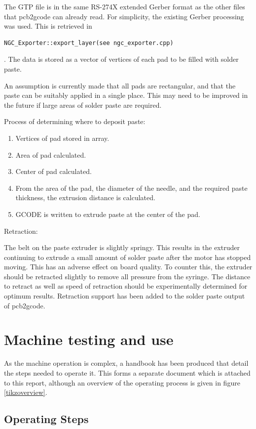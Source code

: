 The GTP file is in the same RS-274X extended Gerber format as the other files that pcb2gcode can already read. For simplicity, the existing Gerber processing was used.
This is retrieved in \begin{verbatim}NGC_Exporter::export_layer(see ngc_exporter.cpp)\end{verbatim}. The data is stored as a vector of vertices of each pad to be filled with solder paste.

An assumption is currently made that all pads are rectangular, and that the paste can be suitably applied in a single place. This may need to be improved in the future if large areas
of solder paste are required.

Process of determining where to deposit paste:

\begin{enumerate}
	\item	Vertices of pad stored in array.
	\item	Area of pad calculated.
	\item	Center of pad calculated.
	\item	From the area of the pad, the diameter of the needle, and the required paste thickness, the extrusion distance is calculated.
	\item	GCODE is written to extrude paste at the center of the pad.
\end{enumerate}

Retraction:

The belt on the paste extruder is slightly springy. This results in the extruder continuing to extrude a small amount of solder paste after the motor has stopped moving.
This has an adverse effect on board quality. To counter this, the extruder should be retracted slightly to remove all pressure from the syringe. The distance to retract
as well as speed of retraction should be experimentally determined for optimum results. Retraction support has been added to the solder paste output of pcb2gcode.


\section{Machine testing and use}
As the machine operation is complex, a handbook has been produced that
detail the steps needed to operate it. This forms a separate document
which is attached to this report, although an overview of the operating
process is given in figure \ref{tikzoverview}.

\subsection{Operating Steps}

